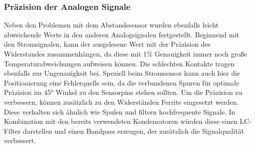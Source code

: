 \subsubsection{Präzision der Analogen Signale}
\label{Mangelnde_Präzision}
Neben den Problemen mit dem Abstandssensor wurden ebenfalls leicht abweichende Werte in den anderen Analogsignalen festgestellt. Beginnend mit den Stromsignalen, kann der ausgelesene Wert mit der Präzision des Widerstandes zusammenhängen, da diese mit 1\% Genauigkeit immer noch große Temperaturabweichungen aufweisen können. Die schlechten Kontakte tragen ebenfalls zur Ungenauigkeit bei. Speziell beim Stromsensor kann auch hier die Positionierung eine Fehlerquelle sein, da die verbundenen Spuren für optimale Präzision im 45° Winkel zu den Sensorpins stehen sollten. Um die Präzision zu verbessern, können zusätzlich zu den Widerständen Ferrite eingesetzt werden. Diese verhalten sich ähnlich wie Spulen und filtern hochfrequente Signale. In Kombination mit den bereits verwendeten Kondensatoren würden diese einen LC-Filter darstellen und einen Bandpass erzeugen, der zusätzlich die Signalqualität verbessert.\\
